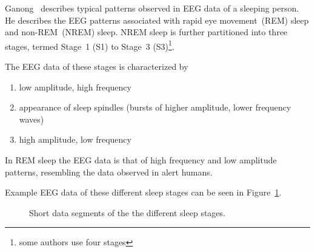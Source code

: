 Ganong~\cite[chapter~11]{Ganong1997} describes typical patterns observed in EEG data of a sleeping person. He describes the EEG patterns associated with rapid eye movement~(REM) sleep and non-REM~(NREM) sleep. NREM sleep is further partitioned into three stages, termed Stage~1 (S1) to Stage~3 (S3)\footnote{some authors use four stages}. 

\newpage
The EEG data of these stages is characterized by

\begin{enumerate}[label={S\arabic*:}]
	\item low amplitude, high frequency
	\item appearance of sleep spindles (bursts of higher amplitude, lower frequency waves)
	\item high amplitude, low frequency
\end{enumerate}

In REM sleep the EEG data is that of high frequency and low amplitude patterns, resembling the data observed in alert humans.

Example EEG data of these different sleep stages can be seen in Figure~\ref{fig:different_sleep_stages}.

\begin{figure}
	\centering

	\begin{subfigure}[b]{\textwidth}
	\end{subfigure}
	
	\caption{Short data segments of the the different sleep stages.}
	\label{fig:different_sleep_stages}
\end{figure}
